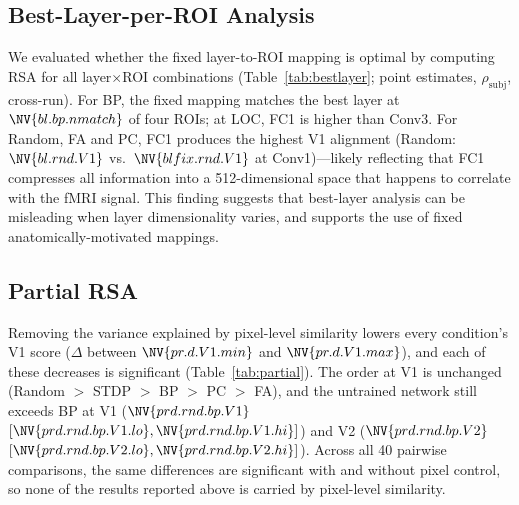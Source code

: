 \documentclass[10pt,twocolumn]{article}
\begin{document}
\subsection{Best-Layer-per-ROI Analysis}

We evaluated whether the fixed layer-to-ROI mapping is optimal by computing RSA for all layer$\times$ROI combinations (Table~\ref{tab:bestlayer}; point estimates, $\rho_{\text{subj}}$, cross-run). For BP, the fixed mapping matches the best layer at $\NV{bl.bp.nmatch}$ of four ROIs; at LOC, FC1 is higher than Conv3. For Random, FA and PC, FC1 produces the highest V1 alignment (Random: $\NV{bl.rnd.V1}$ vs.\ $\NV{blfix.rnd.V1}$ at Conv1)---likely reflecting that FC1 compresses all information into a 512-dimensional space that happens to correlate with the fMRI signal. This finding suggests that best-layer analysis can be misleading when layer dimensionality varies, and supports the use of fixed anatomically-motivated mappings.

\begin{table}[h]
\centering
\caption{Best layer per ROI and its $\rho_{\text{subj}}$ (cross-run, mean of 5 seeds; point estimates). In parentheses: the fixed layer's value where it differs.}
\label{tab:bestlayer}
\small
\resizebox{\columnwidth}{!}{%
}
\end{table}

\subsection{Partial RSA}

Removing the variance explained by pixel-level similarity lowers every condition's V1 score (\(\Delta\) between $\NV{pr.d.V1.min}$ and $\NV{pr.d.V1.max}$), and each of these decreases is significant (Table~\ref{tab:partial}). The order at V1 is unchanged (Random $>$ STDP $>$ BP $>$ PC $>$ FA), and the untrained network still exceeds BP at V1 ($\NV{prd.rnd.bp.V1}$ $[\NV{prd.rnd.bp.V1.lo},\NV{prd.rnd.bp.V1.hi}]$) and V2 ($\NV{prd.rnd.bp.V2}$ $[\NV{prd.rnd.bp.V2.lo},\NV{prd.rnd.bp.V2.hi}]$). Across all 40 pairwise comparisons, the same differences are significant with and without pixel control, so none of the results reported above is carried by pixel-level similarity.

\begin{table}[t]
\centering
\caption{Standard ($\rho_{\text{subj}}$) and partial RSA ($\rho_{\text{partial}}$, pixel similarity controlled) at V1 and V2; $\Delta = \rho_{\text{partial}} - \rho_{\text{subj}}$. Cross-run pairs, repaired model set, per-subject convention, mean of 5 seeds, stimulus-bootstrap 95\% CI.}
\label{tab:partial}
\small
\resizebox{\textwidth}{!}{}
\end{table}
\end{document}
